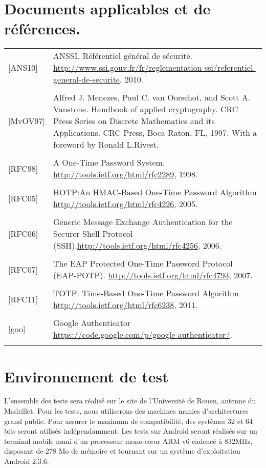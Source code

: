 \documentclass{"../../res/univ-projet"}
\begin{document}
  \section{Documents applicables et de références.}
  \begin{tabular}{p{}>{\raggedright\arraybackslash}p{13cm}}
    {[ANS10]} & {ANSSI. Référentiel général de sécurité. 
    \href{http://www.ssi.gouv.fr/fr/reglementation-ssi/referentiel-general-de-securite}
    {http://www.ssi.gouv.fr/fr/reglementation-ssi/referentiel-general-de-securite}, 2010.}
    \tabularnewline
    \\
    {[MvOV97]} & {Alfred J. Menezes, Paul C. van Oorschot, and Scott A. Vanstone. Handbook of applied
    cryptography. CRC Press Series on Discrete Mathematics and its Applications. CRC Press, Boca
    Raton, FL, 1997. With a foreword by Ronald L.Rivest.}
    \tabularnewline
    \\
    {[RFC98]} & {A One-Time Password System. \href{http://tools.ietf.org/html/rfc2289}
    {http://tools.ietf.org/html/rfc2289}, 1998.}
    \tabularnewline
    \\
    {[RFC05]} & {HOTP:An HMAC-Based One-Time Password Algorithm \href{http://tools.ietf.org/html/rfc4226}{http://tools.ietf.org/html/rfc4226}, 2005.}
    \tabularnewline
    \\
    {[RFC06]} & {Generic Message Exchange Authentication for the Securer Shell Protocol (SSH).\href{http://tools.ietf.org/html/rfc4256}{http://tools.ietf.org/html/rfc4256}, 2006.}
    \tabularnewline
    \\
    {[RFC07]} & {The EAP Protected One-Time Password Protocol (EAP-POTP). \href{http://tools.ietf.org/html/rfc4793}{http://tools.ietf.org/html/rfc4793}, 2007.}
    \tabularnewline
    \\
    {[RFC11]} & {TOTP: Time-Based One-Time Password Algorithm \href{http://tools.ietf.org/html/rfc6238}{http://tools.ietf.org/html/rfc6238}, 2011.}
    \tabularnewline
    \\
    {[goo]} & {Google Authenticator \href{https://code.google.com/p/google-authenticator/}{https://code.google.com/p/google-authenticator/}.}
    \tabularnewline
    \\
  \end{tabular}
  
  \section{Environnement de test}
  L'ensemble des tests sera réalisé sur le site de l'Université de Rouen, antenne du Madrillet.
  Pour les tests, nous utiliserons des machines munies d'architectures grand public. Pour assurer le maximum de compatibilité, des systèmes 32 et 64 bits seront utilisés 
  indépendamment. Les tests sur Android seront réalisés sur un terminal mobile muni d'un processeur mono-cœur ARM v6 cadencé à 832MHz, disposant de 278 Mo de mémoire et tournant sur un 
  système d'exploitation Android 2.3.6.
  
\end{document}

